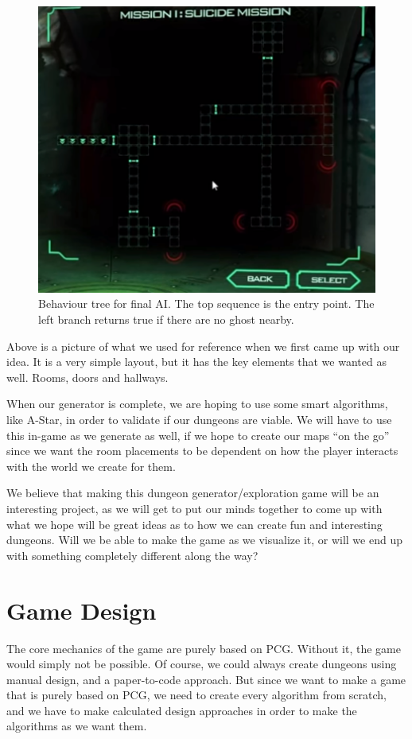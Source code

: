 \documentclass[conference,compsoc]{IEEEtran}
\begin{document}
\begin{figure}[h]
	\graphicspath{{figures/}}
	\includegraphics[width = \columnwidth ]{SpacehulkMap.png}
	\caption{Behaviour tree for final AI. The top sequence is the entry point. The left branch returns true if there are no ghost nearby.}
	\label{fig:behavTree}
\end{figure}

Above is a picture of what we used for reference when we first came up with our idea. It is a very simple layout, but it has the key elements that we wanted as well. Rooms, doors and hallways.

When our generator is complete, we are hoping to use some smart algorithms, like A-Star, in order to validate if our dungeons are viable. We will have to use this in-game as we generate as well, if we hope to create our maps “on the go” since we want the room placements to be dependent on how the player interacts with the world we create for them.

We believe that making this dungeon generator/exploration game will be an interesting project, as we will get to put our minds together to come up with what we hope will be great ideas as to how we can create fun and interesting dungeons. Will we be able to make the game as we visualize it, or will we end up with something completely different along the way? 
\section{Game Design}
The core mechanics of the game are purely based on PCG. Without it, the game would simply not be possible. Of course, we could always create dungeons using manual design, and a paper-to-code approach. But since we want to make a game that is purely based on PCG, we need to create every algorithm from scratch, and we have to make calculated design approaches in order to make the algorithms as we want them.
\end{document}
